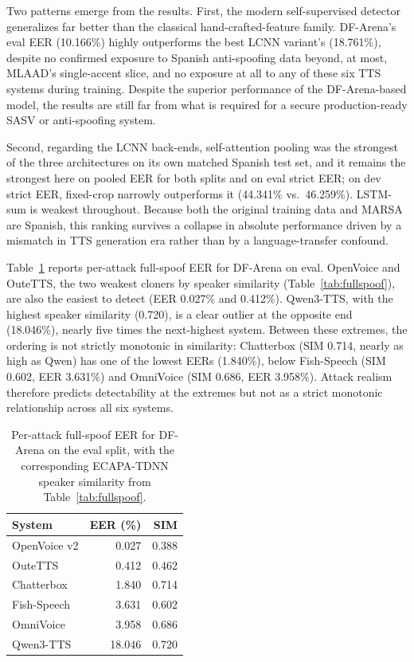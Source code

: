 \documentclass[11pt]{report}
\begin{document}
Two patterns emerge from the results. First, the modern self-supervised
detector generalizes far better than the classical hand-crafted-feature
family. DF-Arena's eval EER (10.166\%) highly outperforms the best LCNN
variant's (18.761\%), despite no confirmed exposure to Spanish
anti-spoofing data beyond, at most, MLAAD's single-accent slice, and no
exposure at all to any of these six TTS systems during training.
Despite the superior performance of the DF-Arena-based model, the
results are still far from what is required for a secure
production-ready SASV or anti-spoofing system.

Second, regarding the LCNN back-ends, self-attention pooling was the
strongest of the three architectures on its own matched Spanish test
set, and it remains the strongest here on pooled EER for both splits
and on eval strict EER; on dev strict EER, fixed-crop narrowly
outperforms it (44.341\% vs.\ 46.259\%). LSTM-sum is weakest throughout.
Because both the original training
data and MARSA are Spanish, this ranking survives a collapse in
absolute performance driven by a mismatch in TTS generation era rather
than by a language-transfer confound.

Table~\ref{tab:fullspoofeer} reports per-attack full-spoof EER for
DF-Arena on eval. OpenVoice and OuteTTS, the two weakest cloners by
speaker similarity (Table~\ref{tab:fullspoof}), are also the easiest
to detect (EER 0.027\% and 0.412\%). Qwen3-TTS, with the highest
speaker similarity (0.720), is a clear outlier at the opposite end
(18.046\%), nearly five times the next-highest system. Between these
extremes, the ordering is not strictly monotonic in similarity:
Chatterbox (SIM 0.714, nearly as high as Qwen) has one of the lowest
EERs (1.840\%), below Fish-Speech (SIM 0.602, EER 3.631\%) and
OmniVoice (SIM 0.686, EER 3.958\%). Attack realism therefore predicts
detectability at the extremes but not as a strict monotonic
relationship across all six systems.

\begin{table}[H]
\centering
\caption{Per-attack full-spoof EER for DF-Arena on the eval split,
with the corresponding ECAPA-TDNN speaker similarity from
Table~\ref{tab:fullspoof}.}
\label{tab:fullspoofeer}
\small
\begin{tabular}{lrr}
\toprule
\textbf{System} & \textbf{EER (\%)} & \textbf{SIM} \\
\midrule
OpenVoice v2 & 0.027 & 0.388 \\
OuteTTS      & 0.412 & 0.462 \\
Chatterbox   & 1.840 & 0.714 \\
Fish-Speech  & 3.631 & 0.602 \\
OmniVoice    & 3.958 & 0.686 \\
Qwen3-TTS    & 18.046 & 0.720 \\
\bottomrule
\end{tabular}
\end{table}
\end{document}
